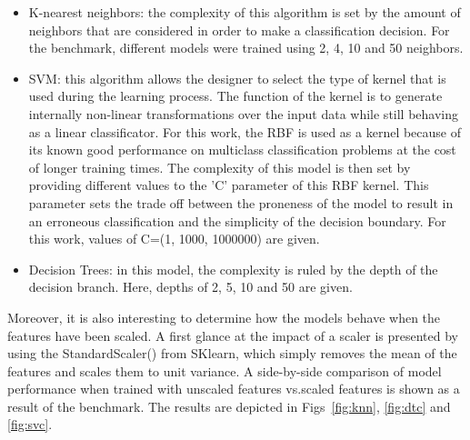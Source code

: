 \begin{itemize}
    \item K-nearest neighbors: the complexity of this algorithm is set by the amount of neighbors that are considered in order to make a classification decision. For the benchmark, different models were trained using 2, 4, 10 and 50 neighbors.
    \item \ac{SVM}: this algorithm allows the designer to select the type of kernel that is used during the learning process. The function of the kernel is to generate internally non-linear transformations over the input data while still behaving as a linear classificator. For this work, the \ac{RBF} is used as a kernel because of its known good performance on multiclass classification problems at the cost of longer training times. The complexity of this model is then set by providing different values to the 'C' parameter of this \ac{RBF} kernel. This parameter sets the trade off between the proneness of the model to result in an erroneous classification and the simplicity of the decision boundary. For this work, values of C=(1, 1000, 1000000) are given.
    \item Decision Trees: in this model, the complexity is ruled by the depth of the decision branch. Here, depths of 2, 5, 10 and 50 are given.
\end{itemize}

Moreover, it is also interesting to determine how the models behave when the features have been scaled. A first glance at the impact of a scaler is presented by using the StandardScaler() from SKlearn, which simply removes the mean of the features and scales them to unit variance. A side-by-side comparison of model performance when trained with unscaled features vs.scaled features is shown as a result of the benchmark. The results are depicted in Figs~\ref{fig:knn}, \ref{fig:dtc} and \ref{fig:svc}.

